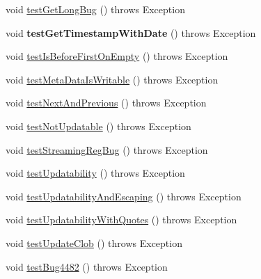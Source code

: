 \begin{DoxyCompactItemize}
\item 
void \mbox{\hyperlink{classtestsuite_1_1regression_1_1_result_set_regression_test_ad99758a5458b83ac934b1a347ae47e5a}{test\+Get\+Long\+Bug}} ()  throws Exception 
\item 
\mbox{\label{classtestsuite_1_1regression_1_1_result_set_regression_test_a23489ba51cbd6ffe491828ee72a871f1}} 
void {\bfseries test\+Get\+Timestamp\+With\+Date} ()  throws Exception 
\item 
void \mbox{\hyperlink{classtestsuite_1_1regression_1_1_result_set_regression_test_a45914f0b82f48f8d02b3660bf7b39a8b}{test\+Is\+Before\+First\+On\+Empty}} ()  throws Exception 
\item 
void \mbox{\hyperlink{classtestsuite_1_1regression_1_1_result_set_regression_test_a6dcc88835bfc825c76f2b561299ba5ae}{test\+Meta\+Data\+Is\+Writable}} ()  throws Exception 
\item 
void \mbox{\hyperlink{classtestsuite_1_1regression_1_1_result_set_regression_test_a0c13a2fe761dffa7df042ede36d977f4}{test\+Next\+And\+Previous}} ()  throws Exception 
\item 
void \mbox{\hyperlink{classtestsuite_1_1regression_1_1_result_set_regression_test_a87b5a0b26c6031bfbaef6527e26abb40}{test\+Not\+Updatable}} ()  throws Exception 
\item 
void \mbox{\hyperlink{classtestsuite_1_1regression_1_1_result_set_regression_test_aa4e05afadbebf3dfcb1ab53ba94e8787}{test\+Streaming\+Reg\+Bug}} ()  throws Exception 
\item 
void \mbox{\hyperlink{classtestsuite_1_1regression_1_1_result_set_regression_test_aee16c849b12feacaadefbdb6c6eb2052}{test\+Updatability}} ()  throws Exception 
\item 
void \mbox{\hyperlink{classtestsuite_1_1regression_1_1_result_set_regression_test_a1f3b74a37f6cd750d879cd56514a2b71}{test\+Updatability\+And\+Escaping}} ()  throws Exception 
\item 
void \mbox{\hyperlink{classtestsuite_1_1regression_1_1_result_set_regression_test_a7b168ae8bd5196ba9aa966cf407b37a3}{test\+Updatability\+With\+Quotes}} ()  throws Exception 
\item 
void \mbox{\hyperlink{classtestsuite_1_1regression_1_1_result_set_regression_test_a996b8a0a196360051ed54e9ccc044c92}{test\+Update\+Clob}} ()  throws Exception 
\item 
void \mbox{\hyperlink{classtestsuite_1_1regression_1_1_result_set_regression_test_adb7d4f5375bd8e7ac8f4cc267e818fea}{test\+Bug4482}} ()  throws Exception 

\end{DoxyCompactItemize}
